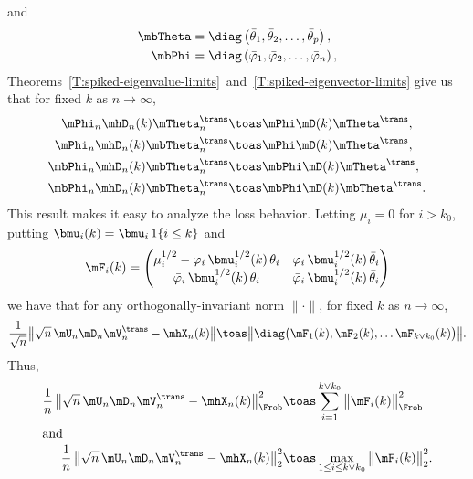 and
\begin{align*}
    \mbTheta
        &=
            \diag\left(
                \bar \theta_1,
                \bar \theta_2,
                \ldots,
                \bar \theta_p
            \right), \\
    \mbPhi
        &=
            \diag\left(
                \bar \varphi_1,
                \bar \varphi_2,
                \ldots,
                \bar \varphi_n
            \right),
\end{align*}
Theorems~\ref{T:spiked-eigenvalue-limits}~and~\ref{T:spiked-eigenvector-limits}
give us that for fixed $k$ as $n \to \infty$,
\begin{align*}
    \mPhi_n \mhD_n(k) \mTheta_n^\trans
        &\toas
            \mPhi \mD(k) \mTheta^\trans, \\
    \mPhi_n \mhD_n(k) \mbTheta_n^\trans
        &\toas
            \mPhi \mD(k) \mTheta^\trans, \\
    \mbPhi_n \mhD_n(k) \mbTheta_n^\trans
        &\toas
            \mbPhi \mD(k) \mTheta^\trans, \\
    \mbPhi_n \mhD_n(k) \mbTheta_n^\trans
        &\toas
            \mbPhi \mD(k) \mbTheta^\trans.
\end{align*}
This result makes it easy to analyze the loss behavior.  Letting $\mu_i = 0$
for $i > k_0$, putting $\bmu_i(k) = \bmu_i \, 1\{i \leq k\}$ and
\[
    \mF_i(k)
        =
            \left(
            \begin{matrix}
                \mu_i^{1/2} - \varphi_i \, \bmu_i^{1/2}(k) \, \theta_i &
                    \varphi_i \, \bmu_i^{1/2}(k) \, \bar \theta_i \\
                \bar \varphi_i \, \bmu_i^{1/2}(k) \, \theta_i &
                    \bar \varphi_i \, \bmu_i^{1/2}(k) \, \bar \theta_i
            \end{matrix}
            \right)
\]
we have that for any orthogonally-invariant norm $\| \cdot \|$, for
fixed $k$ as $n\to \infty$,
\[
    \frac{1}{\sqrt{n}}
    \big\| \sqrt{n} \, \mU_n \mD_n \mV_n^\trans - \mhX_n(k) \big\|
        \toas
            \big\|
                \diag \big(
                    \mF_1(k),
                    \mF_2(k),
                    \ldots
                    \mF_{k \vee k_0}(k)
                \big) \big\|.
\]
Thus,
\begin{align*}
    \frac{1}{n} \,
    \big\| \sqrt{n} \, \mU_n \mD_n \mV_n^\trans - \mhX_n(k) \big\|_\Frob^2
        &\toas
            \sum_{i=1}^{k \vee k_0}
                \big\| \mF_i(k) \big\|_\Frob^2 \\
\intertext{and}
    \frac{1}{n} \,
    \big\| \sqrt{n} \, \mU_n \mD_n \mV_n^\trans - \mhX_n(k) \big\|_2^2
        &\toas
            \max_{1 \leq i \leq k \vee k_0}
                \big\| \mF_i(k) \big\|_2^2.
\end{align*}
